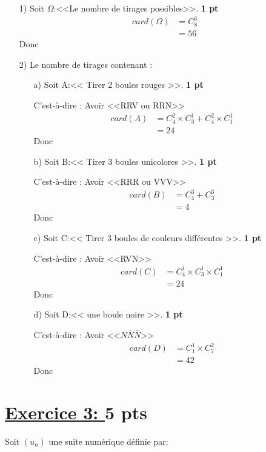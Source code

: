 \documentclass[12pt]{article}
\begin{document}
\begin{itemize}
\item[1)] Soit $\Omega$:<<Le nombre de tirages possibles>>. \textbf{1 pt}
\begin{align*}
card(\Omega)&=C_{8}^{3}\\
		&=56	
\end{align*}
Donc \textcolor{green}{}
\item[2)] Le nombre de tirages contenant :
\begin{itemize}
\item[a)] Soit A:<< Tirer 2 boules rouges >>. \textbf{1 pt}

C'est-à-dire : Avoir <<RRV ou RRN>>
\begin{align*}
card(A)&=C_{4}^{2}\times C_{3}^{1}+C_{4}^{2}\times C_{1}^{1}\\
		&=24
\end{align*}
Donc \textcolor{green}{}
\item[b)] Soit B:<< Tirer 3 boules unicolores >>. \textbf{1 pt}

C'est-à-dire : Avoir <<RRR ou VVV>>
\begin{align*}
card(B)&=C_{4}^{3}+C_{3}^{3}\\
	&=4
\end{align*}
Donc \textcolor{green}{}
\item[c)] Soit C:<< Tirer 3 boules de couleurs différentes >>. \textbf{1 pt}

C'est-à-dire : Avoir <<RVN>>
\begin{align*}
card(C)&=C_{4}^{1} \times C_{3}^{1} \times C_{1}^{1}\\
		&=24
\end{align*}
Donc \textcolor{green}{}
\item[d)] Soit D:<< une boule noire >>. \textbf{1 pt}

C'est-à-dire : Avoir <<$N\overline{N}\overline{N}$>>
\begin{align*}
card(D)&=C_{1}^{1} \times C_{7}^{2}\\
		&=42
\end{align*}
Donc \textcolor{green}{}
\end{itemize}
\end{itemize}
\section*{\underline{Exercice 3: }\textbf{5 pts}}
Soit $(u_n)$ une suite numérique définie par:
\end{document}
